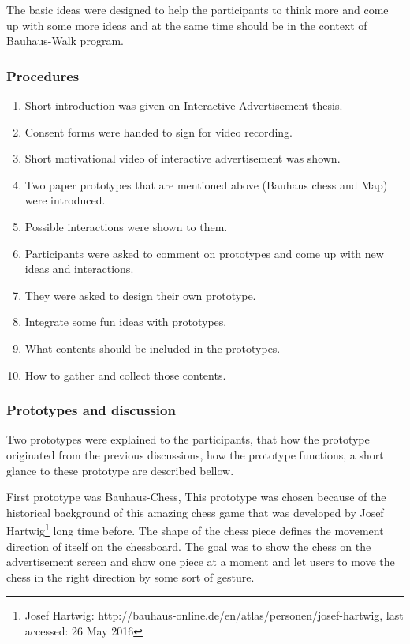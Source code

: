 The basic ideas were designed to help the participants to think more and come up with some more ideas and at the same time should be in the context of Bauhaus-Walk program. 

\subsubsection{Procedures}
\begin{enumerate}
\item   Short introduction was given on Interactive Advertisement thesis.
\item   Consent forms were handed to sign for video recording.
\item	Short motivational video of interactive advertisement was shown.
\item	Two paper prototypes that are mentioned above (Bauhaus chess and Map) were introduced.
\item	Possible interactions were shown to them.
\item	Participants were asked to comment on prototypes and come up with new ideas and interactions.
\item	They were asked to design their own prototype.
\item	Integrate some fun ideas with prototypes.
\item	What contents should be included in the prototypes.
\item	How to gather and collect those contents.
\end{enumerate}

\subsubsection{Prototypes and discussion}
Two prototypes were explained to the participants, that how the prototype originated from the previous discussions, how the prototype functions, a short glance to these prototype are described bellow. 

First prototype was Bauhaus-Chess, This prototype was chosen because of the historical background of this amazing chess game that was developed by Josef Hartwig\footnote{Josef Hartwig: http://bauhaus-online.de/en/atlas/personen/josef-hartwig, last accessed: 26 May 2016} long time before. The shape of the chess piece defines the movement direction of itself on the chessboard. The goal was to show the chess on the advertisement screen and show one piece at a moment and let users to move the chess in the right direction by some sort of gesture. 

